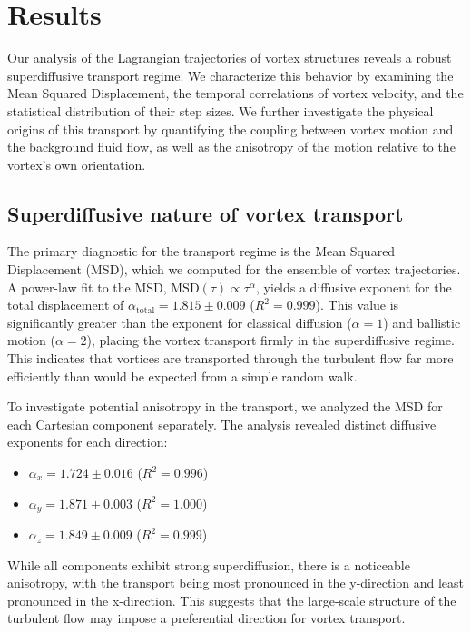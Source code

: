 \documentclass[]{article}
\begin{document}
\section{Results}
\label{sec:results}
Our analysis of the Lagrangian trajectories of vortex structures reveals a robust superdiffusive transport regime. We characterize this behavior by examining the Mean Squared Displacement, the temporal correlations of vortex velocity, and the statistical distribution of their step sizes. We further investigate the physical origins of this transport by quantifying the coupling between vortex motion and the background fluid flow, as well as the anisotropy of the motion relative to the vortex's own orientation.

\subsection{Superdiffusive nature of vortex transport}
The primary diagnostic for the transport regime is the Mean Squared Displacement (MSD), which we computed for the ensemble of vortex trajectories. A power-law fit to the MSD, $\text{MSD}(\tau) \propto \tau^\alpha$, yields a diffusive exponent for the total displacement of $\alpha_{\text{total}} = 1.815 \pm 0.009$ ($R^2 = 0.999$). This value is significantly greater than the exponent for classical diffusion ($\alpha=1$) and ballistic motion ($\alpha=2$), placing the vortex transport firmly in the superdiffusive regime. This indicates that vortices are transported through the turbulent flow far more efficiently than would be expected from a simple random walk.

To investigate potential anisotropy in the transport, we analyzed the MSD for each Cartesian component separately. The analysis revealed distinct diffusive exponents for each direction:
\begin{itemize}
    \item $\alpha_x = 1.724 \pm 0.016$ ($R^2 = 0.996$)
    \item $\alpha_y = 1.871 \pm 0.003$ ($R^2 = 1.000$)
    \item $\alpha_z = 1.849 \pm 0.009$ ($R^2 = 0.999$)
\end{itemize}
While all components exhibit strong superdiffusion, there is a noticeable anisotropy, with the transport being most pronounced in the y-direction and least pronounced in the x-direction. This suggests that the large-scale structure of the turbulent flow may impose a preferential direction for vortex transport.
\end{document}
